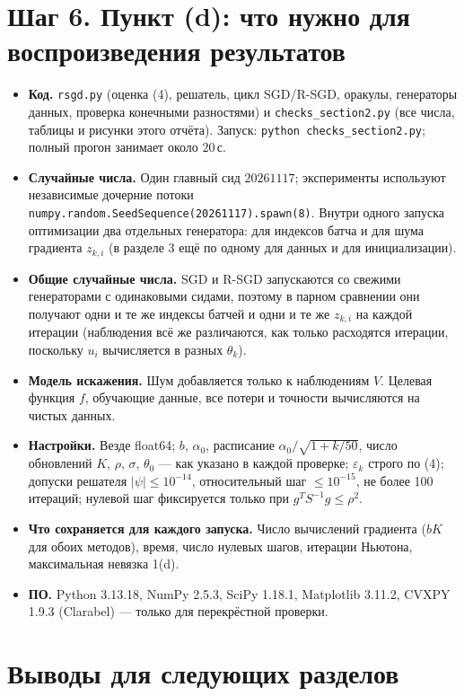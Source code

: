 \documentclass[11pt,a4paper]{article}
\begin{document}
\section*{Шаг 6. Пункт (d): что нужно для воспроизведения результатов}

\begin{itemize}
\item \textbf{Код.} \texttt{rsgd.py} (оценка (4), решатель, цикл SGD/R-SGD, оракулы,
генераторы данных, проверка конечными разностями) и \texttt{checks\_section2.py} (все
числа, таблицы и рисунки этого отчёта). Запуск: \texttt{python checks\_section2.py};
полный прогон занимает около 20\,с.
\item \textbf{Случайные числа.} Один главный сид $20261117$; эксперименты используют
независимые дочерние потоки \texttt{numpy.random.SeedSequence(20261117).spawn(8)}.
Внутри одного запуска оптимизации два отдельных генератора: для индексов батча и для
шума градиента $z_{k,i}$ (в разделе 3 ещё по одному для данных и для инициализации).
\item \textbf{Общие случайные числа.} SGD и R-SGD запускаются со свежими генераторами с
одинаковыми сидами, поэтому в парном сравнении они получают одни и те же индексы батчей и
одни и те же $z_{k,i}$ на каждой итерации (наблюдения всё же различаются, как только
расходятся итерации, поскольку $u_i$ вычисляется в разных $\theta_k$).
\item \textbf{Модель искажения.} Шум добавляется только к наблюдениям $V$. Целевая
функция $f$, обучающие данные, все потери и точности вычисляются на чистых данных.
\item \textbf{Настройки.} Везде float64; $b$, $\alpha_0$, расписание
$\alpha_0/\sqrt{1+k/50}$, число обновлений $K$, $\rho$, $\sigma$, $\theta_0$ — как указано
в каждой проверке; $\varepsilon_k$ строго по (4); допуски решателя $|\psi|\le10^{-14}$,
относительный шаг $\le10^{-15}$, не более 100 итераций; нулевой шаг фиксируется только
при $g^TS^{-1}g\le\rho^2$.
\item \textbf{Что сохраняется для каждого запуска.} Число вычислений градиента ($bK$ для
обоих методов), время, число нулевых шагов, итерации Ньютона, максимальная невязка 1(d).
\item \textbf{ПО.} Python 3.13.18, NumPy 2.5.3, SciPy 1.18.1, Matplotlib 3.11.2,
CVXPY 1.9.3 (Clarabel) — только для перекрёстной проверки.
\end{itemize}

\section*{Выводы для следующих разделов}
\end{document}
